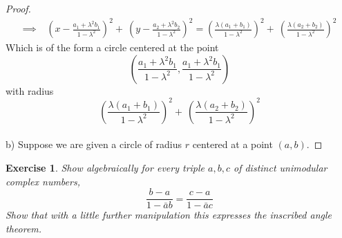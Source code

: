 \documentclass{article}
\newtheorem{exercise}{Exercise}
\begin{document}
\begin{proof}
\begin{align*}
  \implies \ & \left(x - \frac{a_{1} + \lambda^{2}b_{1}}{1-\lambda^{2}}\right) ^{2} + \ \left(y - \frac{a_{2} + \lambda^{2}b_{2}}{1-\lambda^{2}}\right) ^{2} =  \left(\frac{\lambda(a_{1} + b_{1})}{1-\lambda^{2}}\right)^{2} + \ \left(\frac{\lambda(a_{2} + b_{2})}{1-\lambda^{2}}\right)^{2}  
\end{align*}
Which is of the form a circle centered at the point \[\left(\frac{a_{1}+\lambda^{2}b_{1}}{1-\lambda^{2}}, \frac{a_{1}+\lambda^{2}b_{1}}{1-\lambda^{2}}\right)\] with radius \[ \left(\frac{\lambda(a_{1} + b_{1})}{1-\lambda^{2}}\right)^{2} + \ \left(\frac{\lambda(a_{2} + b_{2})}{1-\lambda^{2}}\right)^{2} \] 
\\ 
b) Suppose we are given a circle of radius $r$ centered at a point $(a, b)$. 
\end{proof}

\begin{exercise}
  Show algebraically for every triple $a,b,c$ of distinct unimodular complex numbers, \[\frac{b-a}{1-\bar{a}b} = \frac{c-a}{1-\bar{a}c} \] Show that with a little further manipulation this expresses the inscribed angle theorem.
\end{exercise}
\end{document}
